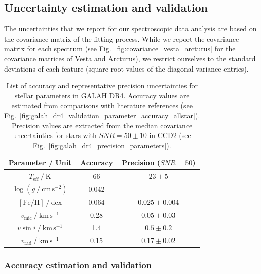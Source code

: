 \documentclass[
  journal=pasa,
  manuscript=research-paper, %
  year=2023,
  volume=37
]{cup-journal}
\begin{document}
\subsection{Uncertainty estimation and validation}
\label{sec:uncertainty}

The uncertainties that we report for our spectroscopic data analysis are based on the covariance matrix of the fitting process. While we report the covariance matrix for each spectrum (see Fig.~\ref{fig:covariance_vesta_arcturus} for the covariance matrices of Vesta and Arcturus), we restrict ourselves to the standard deviations of each feature (square root values of the diagonal variance entries).

\begin{table}
\centering
\caption{List of accuracy and representative precision uncertainties for stellar parameters in GALAH DR4. Accuracy values are estimated from comparisons with literature references (see Fig.~\ref{fig:galah_dr4_validation_parameter_accuracy_allstar}). Precision values are extracted from the median covariance uncertainties for stars with $SNR = 50 \pm 10$ in CCD2 (see Fig.~\ref{fig:galah_dr4_precision_parameters}).}
\label{tab:accuracy_precision}
\begin{tabular}{ccc}
\hline \hline
Parameter / Unit & Accuracy & Precision ($SNR = 50$)\\
\hline
$T_\text{eff}~/~\mathrm{K}$          & 66     & $23 \pm 5$ \\
$\log (g~/~\mathrm{cm\,s^{-2}})$     &  0.042 & -- \\
$\mathrm{[Fe/H]}~/~\mathrm{dex}$     &  0.064 & $0.025 \pm 0.004$ \\
$v_\text{mic}~/~\mathrm{km\,s^{-1}}$ &  0.28  & $0.05 \pm 0.03$ \\
$v \sin i~/~\mathrm{km\,s^{-1}}$     &  1.4   & $0.5 \pm 0.2$ \\
$v_\text{rad}~/~\mathrm{km\,s^{-1}}$ &  0.15  & $0.17 \pm 0.02$ \\
\hline
\end{tabular}
\end{table}

\subsubsection{Accuracy estimation and validation} \label{sec:uncertainty_accuracy}
\end{document}

